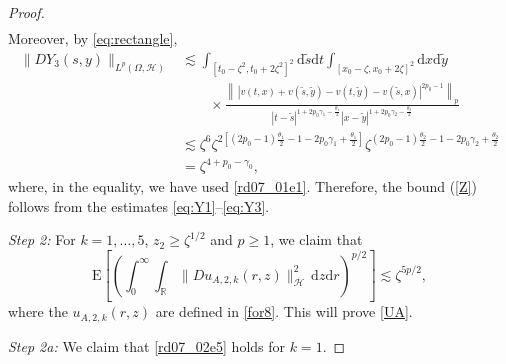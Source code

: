 \documentclass[12pt,a4paper]{article}
\newcommand{\R}{{\mathbb{R}}}
\newcommand{\E}{\mathrm{E}}
\renewcommand{\d}{\mathrm{d}}
\newcommand {\deltah}{{\zeta}}
\newcommand{\<}{\langle}
\renewcommand{\>}{\rangle}
\begin{document}
\begin{proof}
\begin{align}
           \end{align}
Moreover, by \eqref{eq:rectangle}, 
           \begin{align}\label{eq:Y3}
                       \|DY_3(s,y)\|_{L^p(\Omega, \mathcal{H})}&\lesssim \int_{[t_0-\deltah^2, t_0+2\deltah^2]^2}\d \tilde{s}\d t \int_{[x_0-\deltah, x_0+2\deltah]^2} \d x\d \tilde{y} \\
                       &\qquad \times  
             \frac {\left\|\, |v(t,x)+v(\tilde{s},\tilde{y})-v(t,\tilde{y})-v(\tilde{s},x)|^{2p_0-1}\right\|_{p}
            }{|t-\tilde{s}|^{1+2p_0\gamma_1 -\frac{\theta_1}{2}}|x-\tilde{y}|^{1+2p_0\gamma_2-\frac{\theta_2}{2}}} \nonumber\\
            &\lesssim \deltah^{6}\deltah^{2\left[(2p_0-1)\frac{\theta_1}{2}-1-2p_0\gamma_1+\frac{\theta_1}{2}\right]}
            \deltah^{(2p_0-1)\frac{\theta_2}{2}-1-2p_0\gamma_2+\frac{\theta_2}{2}} \nonumber \\
            &= \deltah^{4+p_0-\gamma_0},  \nonumber
           \end{align}
where, in the equality, we have used \eqref{rd07_01e1}. Therefore, the bound  (\ref{Z})  follows from the estimates \eqref{eq:Y1}--\eqref{eq:Y3}.
  \medskip
  
 \noindent
 {\it Step 2:} For $k=1,\dots, 5$, $z_2 \geq \zeta^{1/2}$ and $p \geq 1$, we claim that 
 \begin{equation} \label{rd07_02e5}
           \E\left[\left(\int_0^\infty\int_\R \|Du_{A,2,k}(r,z)\|_\mathcal{H}^2\, \d z\d r\right)^{p/2}\right] \lesssim \deltah^{5p/2},
\end{equation}
 where the $u_{A,2,k}(r, z)$ are defined in \eqref{for8}. This will prove \eqref{UA}.
 
  \medskip
 \noindent
 {\it Step 2a:}  We claim that \eqref{rd07_02e5} holds for $k=1$.


\end{proof}
\end{document}
